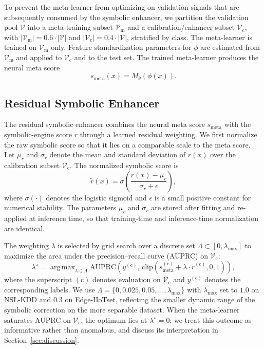 \documentclass[pdflatex,sn-mathphys-num]{sn-jnl}
\DeclareMathOperator*{\argmax}{arg\,max}
\theoremstyle{thmstyleone}
\theoremstyle{thmstyletwo}
\theoremstyle{thmstylethree}
\begin{document}
To prevent the meta-learner from optimizing on validation signals that are subsequently consumed by the symbolic enhancer, we partition the validation pool $\mathcal{V}$ into a meta-training subset $\mathcal{V}_{\mathrm{m}}$ and a calibration/enhancer subset $\mathcal{V}_{\mathrm{c}}$, with $|\mathcal{V}_{\mathrm{m}}| = 0.6 \cdot |\mathcal{V}|$ and $|\mathcal{V}_{\mathrm{c}}| = 0.4 \cdot |\mathcal{V}|$, stratified by class. The meta-learner is trained on $\mathcal{V}_{\mathrm{m}}$ only. Feature standardization parameters for $\phi$ are estimated from $\mathcal{V}_{\mathrm{m}}$ and applied to $\mathcal{V}_{\mathrm{c}}$ and to the test set. The trained meta-learner produces the neural meta score
\begin{equation}
\label{eq:meta-score}
s_{\mathrm{meta}}(x) = M_\theta\!\left( \phi(x) \right).
\end{equation}

\subsection{Residual Symbolic Enhancer}\label{sec:method-symbolic}

The residual symbolic enhancer combines the neural meta score $s_{\mathrm{meta}}$ with the symbolic-engine score $r$ through a learned residual weighting. We first normalize the raw symbolic score so that it lies on a comparable scale to the meta score. Let $\mu_r$ and $\sigma_r$ denote the mean and standard deviation of $r(x)$ over the calibration subset $\mathcal{V}_{\mathrm{c}}$. The normalized symbolic score is
\begin{equation}
\label{eq:sym-normalize}
\tilde{r}(x) = \sigma\!\left( \frac{r(x) - \mu_r}{\sigma_r + \epsilon} \right),
\end{equation}
where $\sigma(\cdot)$ denotes the logistic sigmoid and $\epsilon$ is a small positive constant for numerical stability. The parameters $\mu_r$ and $\sigma_r$ are stored after fitting and re-applied at inference time, so that training-time and inference-time normalization are identical.

The weighting $\lambda$ is selected by grid search over a discrete set $\Lambda \subset [0, \lambda_{\max}]$ to maximize the area under the precision--recall curve (AUPRC) on $\mathcal{V}_{\mathrm{c}}$:
\begin{equation}
\label{eq:lambda-objective}
\lambda^{\star} = \argmax_{\lambda \in \Lambda} \mathrm{AUPRC}\!\left( y^{(\mathrm{c})},\, \mathrm{clip}(s_{\mathrm{meta}}^{(\mathrm{c})} + \lambda \cdot \tilde{r}^{(\mathrm{c})}, 0, 1) \right),
\end{equation}
where the superscript $(\mathrm{c})$ denotes evaluation on $\mathcal{V}_{\mathrm{c}}$ and $y^{(\mathrm{c})}$ denotes the corresponding labels. We use $\Lambda = \{0, 0.025, 0.05, \dots, \lambda_{\max}\}$ with $\lambda_{\max}$ set to $1.0$ on NSL-KDD and $0.3$ on Edge-IIoTset, reflecting the smaller dynamic range of the symbolic correction on the more separable dataset. When the meta-learner saturates AUPRC on $\mathcal{V}_{\mathrm{c}}$, the optimum lies at $\lambda^{\star} = 0$; we treat this outcome as informative rather than anomalous, and discuss its interpretation in Section~\ref{sec:discussion}.
\end{document}
